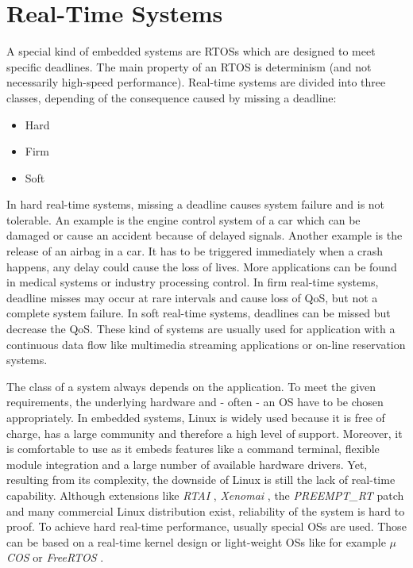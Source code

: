 \section{Real-Time Systems}
A special kind of embedded systems are \acp{RTOS} which are designed to meet specific deadlines. 
The main property of an \ac{RTOS} is determinism (and not necessarily high-speed performance). 
Real-time systems are divided into three classes, depending of the consequence caused by missing a deadline:
\begin{itemize}
	\item Hard
	\item Firm
	\item Soft
\end{itemize}
In hard real-time systems, missing a deadline causes system failure and is not tolerable.  
An example is the engine control system of a car which can be damaged or cause an accident because of delayed signals.
Another example is the release of an airbag in a car. 
It has to be triggered immediately when a crash happens, any delay could cause the loss of lives. 
More applications can be found in medical systems or industry processing control.  
In firm real-time systems, deadline misses may occur at rare intervals and cause loss of \ac{QoS}, but not a complete system failure.
In soft real-time systems, deadlines can be missed but decrease the \ac{QoS}. 
These kind of systems are usually used for application with a continuous data flow like multimedia streaming applications or on-line reservation systems.
\par
The class of a system always depends on the application. 
To meet the given requirements, the underlying hardware and - often - an \ac{OS} have to be chosen appropriately. 
In embedded systems, Linux is widely used because it is free of charge, has a large community and therefore a high level of support. 
Moreover, it is comfortable to use as it embeds features like a command terminal, flexible module integration and a large number of available hardware drivers. 
Yet, resulting from its complexity, the downside of Linux is still the lack of real-time capability. 
Although extensions like \textit{\ac{RTAI}} \cite{rtai}, \textit{Xenomai} \cite{xenomai}, the \textit{PREEMPT\_RT} patch and many commercial Linux distribution exist, reliability of the system is hard to proof. 
To achieve hard real-time performance, usually special \acp{OS} are used. 
Those can be based on a real-time kernel design or light-weight \acp{OS} like for example \textit{$\mu$COS} \cite{micrium:microcos} or \textit{FreeRTOS} \cite{freertos}.
